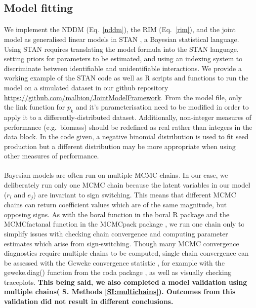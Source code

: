 \documentclass[a4,12pt]{article}
\begin{document}
\begin{refsection}
    \subsection{Model fitting}

        \paragraph{}        
        We implement the NDDM (Eq.~\ref{nddm}), the RIM (Eq.~\ref{rim}), and the joint model as generalised linear models in STAN \parencite{Carpenter2017}, a Bayesian statistical language. Using STAN requires translating the model formula into the STAN language, setting priors for parameters to be estimated, and using an indexing system to discriminate between identifiable and unidentifiable interactions. We provide a working example of the STAN code as well as R scripts and functions to run the model on a simulated dataset in our github repository \url{https://github.com/malbion/JointModelFramework}.
        From the model file, only the link function for $p_k$ and it's parameterisation need to be modified in order to apply it to a differently-distributed dataset. Additionally, non-integer measures of performance (e.g.\ biomass) should be redefined as real rather than integers in the data block. In the code given, a negative binomial distribution is used to fit seed production but a different distribution may be more appropriate when using other measures of performance.   

        \paragraph{}
        Bayesian models are often run on multiple MCMC chains. In our case, we deliberately run only one MCMC chain because the latent variables in our model ($r_i$ and $e_j$) are invariant to sign switching. This means that different MCMC chains can return coefficient values which are of the same magnitude, but opposing signs. As with the boral function in the boral R package \parencite{Hui2021} and the MCMCfactanal function in the MCMCpack package \parencite{Martin2011}, we run one chain only to simplify issues with checking chain convergence and computing parameter estimates which arise from sign-switching. Though many MCMC convergence diagnostics require multiple chains to be computed, single chain convergence can be assessed with the Geweke convergence statistic \parencite{Geweke1992}, for example with the geweke.diag() function from the coda package \parencite{Plummer2006}, as well as visually checking traceplots. \textbf{This being said, we also completed a model validation using multiple chains( S. Methods \ref{SI:multichains}). Outcomes from this validation did not result in different conclusions.}


\end{refsection}
\end{document}
